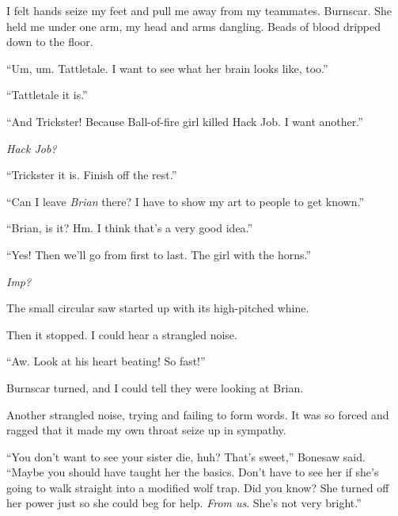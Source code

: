 I felt hands seize my feet and pull me away from my teammates.  Burnscar.  She held me under one arm, my head and arms dangling.  Beads of blood dripped down to the floor.



``Um, um.  Tattletale.  I want to see what her brain looks like, too.''



``Tattletale it is.''



``And Trickster!  Because Ball-of-fire girl killed Hack Job.  I want another.''



\emph{Hack Job?}



``Trickster it is.  Finish off the rest.''



``Can I leave \emph{Brian} there?  I have to show my art to people to get known.''



``Brian, is it?  Hm.  I think that's a very good idea.''



``Yes!  Then we'll go from first to last.  The girl with the horns.''



\emph{Imp?}



The small circular saw started up with its high-pitched whine.



Then it stopped.  I could hear a strangled noise.



``Aw.  Look at his heart beating!  So fast!''



Burnscar turned, and I could tell they were looking at Brian.



Another strangled noise, trying and failing to form words.  It was so forced and ragged that it made my own throat seize up in sympathy.



``You don't want to see your sister die, huh?  That's sweet,'' Bonesaw said.  ``Maybe you should have taught her the basics.  Don't have to see her if she's going to walk straight into a modified wolf trap.  Did you know?  She turned off her power just so she could beg for help.  \emph{From us}.  She's not very bright.''



